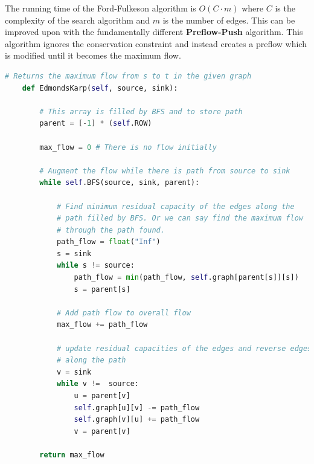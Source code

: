 \documentclass[12pt]{article} %
\begin{document}
\par The running time of the Ford-Fulkeson algorithm is $O(C \cdot m)$ where $C$ is the complexity of the search algorithm and $m$ is the number of edges. This can be improved upon with the fundamentally different \textbf{Preflow-Push} algorithm. This algorithm ignores the conservation constraint and instead creates a preflow which is modified until it becomes the maximum flow.

\begin{lstlisting}[language=Python, caption=Edmonds-Karp in Python]
# Returns the maximum flow from s to t in the given graph
    def EdmondsKarp(self, source, sink):
 
        # This array is filled by BFS and to store path
        parent = [-1] * (self.ROW)
 
        max_flow = 0 # There is no flow initially
 
        # Augment the flow while there is path from source to sink
        while self.BFS(source, sink, parent):
 
            # Find minimum residual capacity of the edges along the
            # path filled by BFS. Or we can say find the maximum flow
            # through the path found.
            path_flow = float("Inf")
            s = sink
            while s != source:
                path_flow = min(path_flow, self.graph[parent[s]][s])
                s = parent[s]
 
            # Add path flow to overall flow
            max_flow += path_flow
 
            # update residual capacities of the edges and reverse edges
            # along the path
            v = sink
            while v !=  source:
                u = parent[v]
                self.graph[u][v] -= path_flow
                self.graph[v][u] += path_flow
                v = parent[v]
 
        return max_flow
\end{lstlisting}
\end{document}
